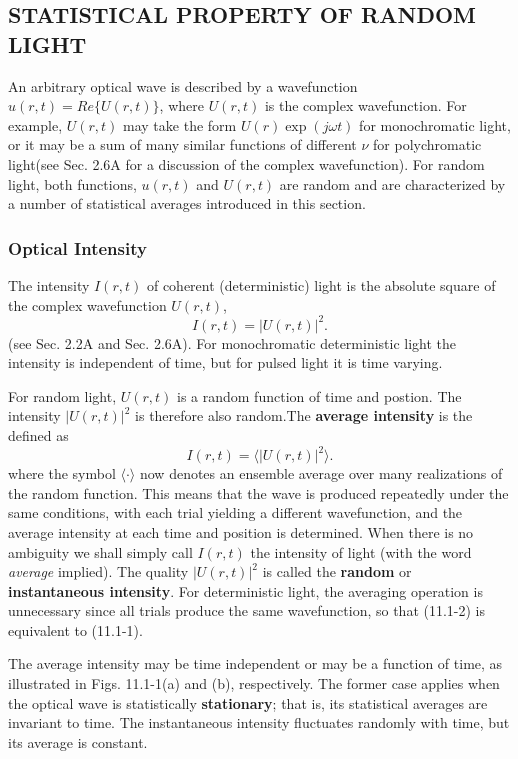 \documentclass{article}
\numberwithin{figure}{subsection}
\numberwithin{table}{subsection}
\begin{document}
\bigbreak\begingroup
\color{ksc}
\subsection{STATISTICAL PROPERTY OF RANDOM LIGHT}
\endgroup
An arbitrary optical wave is described by a wavefunction $ u(r,t) = Re\{U(r,t)\} $, where $ U(r,t) $
is the complex wavefunction. For example, $ U(r,t) $ may take the form $ U(r)\exp(j\omega t)$
for monochromatic light, or it may be a sum of many similar functions of different $\nu$ for polychromatic light(see Sec. 2.6A  for a discussion of the complex wavefunction). For random 
light, both functions, $ u(r,t) $ and $ U(r,t) $ are random and are characterized by a number of statistical
averages introduced in this section.

\bigbreak\begingroup
\color{ksc}
\subsubsection{Optical Intensity}
\endgroup
The intensity $ I(r,t )$ of  coherent (deterministic) light is the absolute square of the complex wavefunction $ U(r,t) $,
\begin{equation}
I(r,t) = \lvert U(r,t) \rvert ^2 .
\end{equation}
(see Sec. 2.2A and Sec. 2.6A). For monochromatic deterministic light the intensity is independent of time, but for pulsed 
light it is time varying.
\par For random light, $ U(r,t) $ is a random function of time and postion. The intensity  $ \lvert U(r,t) \rvert ^2 $ is therefore also random.The \textbf{average intensity} is the defined as 
\begin{equation}
I(r,t) = \langle \lvert U(r,t) \rvert ^2 \rangle .
\end{equation}
where the symbol $ \langle \cdot \rangle $ now denotes an ensemble average over many realizations of the random function. This means that the wave
is produced repeatedly under the same conditions, with each trial yielding a different wavefunction, and the average intensity at each time and position is determined. When there is no ambiguity we shall simply call $ I(r,t) $ the intensity of light (with the word \textsl{average} implied).
The quality $ \lvert U(r,t) \rvert ^2 $ is called the \textbf{random} or \textbf{instantaneous intensity}. For deterministic light, the averaging operation is unnecessary since all trials produce the same wavefunction, so that (11.1-2) is equivalent to (11.1-1).
\par The average intensity may be time independent or may be a function of time, as illustrated in Figs. 11.1-1(a) and (b), respectively. The former case applies when the optical wave is statistically \textbf{stationary}; that is, its statistical averages are invariant to time. The instantaneous intensity fluctuates randomly with time, but its average is constant.
\end{document}
